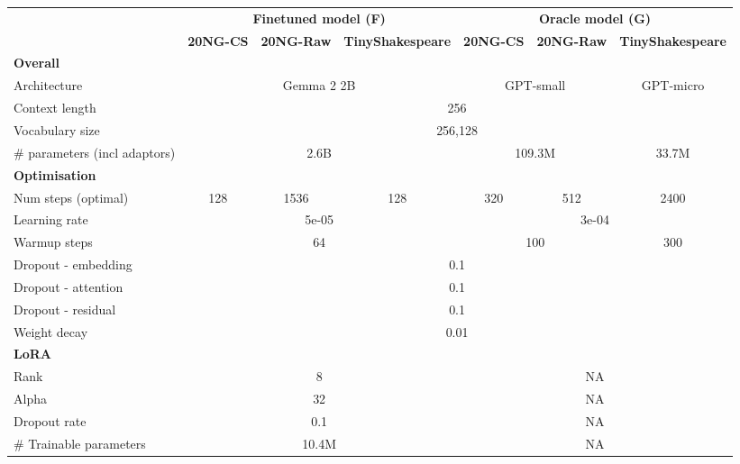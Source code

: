 
\begin{tabular}{lcccccc}
\toprule
& \multicolumn{3}{c}{\textbf{Finetuned model (F)}} & \multicolumn{3}{c}{\textbf{Oracle model (G)}} \\
\cmidrule(lr){2-4} \cmidrule(lr){5-7}
& \textbf{20NG-CS} & \textbf{20NG-Raw} & \textbf{TinyShakespeare }& \textbf{20NG-CS }& \textbf{20NG-Raw} & \textbf{TinyShakespeare} \\
\midrule
\multicolumn{7}{l}{\textbf{Overall}} \\
Architecture & \multicolumn{3}{c}{Gemma 2 2B} & \multicolumn{2}{c}{GPT-small} & GPT-micro \\
Context length &  \multicolumn{6}{c}{256} \\
Vocabulary size & \multicolumn{6}{c}{256,128} \\
\# parameters (incl adaptors) & \multicolumn{3}{c}{2.6B} & \multicolumn{2}{c}{109.3M} & 33.7M \\
\midrule
\multicolumn{7}{l}{\textbf{Optimisation}} \\
Num steps (optimal) & 128 & 1536 & 128 & 320 & 512 & 2400 \\
Learning rate & \multicolumn{3}{c}{5e-05} & \multicolumn{3}{c}{3e-04} \\
Warmup steps & \multicolumn{3}{c}{64} & \multicolumn{2}{c}{100} & 300 \\
Dropout - embedding  &  \multicolumn{6}{c}{0.1} \\
Dropout - attention  &  \multicolumn{6}{c}{0.1} \\
Dropout - residual  &  \multicolumn{6}{c}{0.1} \\
Weight decay  &  \multicolumn{6}{c}{0.01} \\
\midrule
\multicolumn{7}{l}{\textbf{LoRA}} \\
Rank & \multicolumn{3}{c}{8} & \multicolumn{3}{c}{NA} \\
Alpha & \multicolumn{3}{c}{32} & \multicolumn{3}{c}{NA} \\
Dropout rate & \multicolumn{3}{c}{0.1} & \multicolumn{3}{c}{NA} \\
\# Trainable parameters & \multicolumn{3}{c}{10.4M} & \multicolumn{3}{c}{NA} \\
\bottomrule
\end{tabular}
